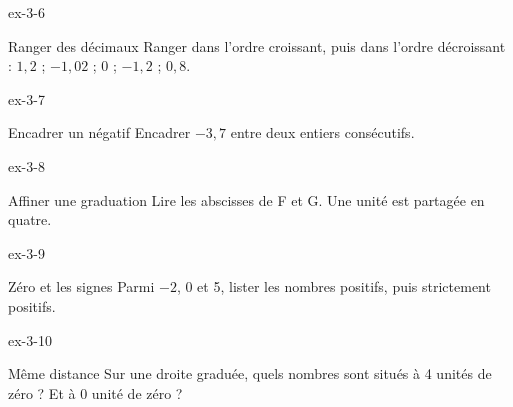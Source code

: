 \begin{blocLivre}{ex-3-6}\begin{exercice}[2]{Ranger des décimaux}
Ranger dans l’ordre croissant, puis dans l’ordre décroissant : $1{,}2$ ; $-1{,}02$ ; 0 ; $-1{,}2$ ; $0{,}8$.
\end{exercice}\end{blocLivre}
\begin{blocLivre}{ex-3-7}\begin{exercice}[2]{Encadrer un négatif}
Encadrer $-3{,}7$ entre deux entiers consécutifs.
\end{exercice}\end{blocLivre}
\begin{blocLivre}{ex-3-8}\begin{exercice}[2]{Affiner une graduation}
Lire les abscisses de F et G. Une unité est partagée en quatre.
\label{fig-ex-3-8}
\end{exercice}\end{blocLivre}
\begin{blocLivre}{ex-3-9}\begin{exercice}[2]{Zéro et les signes}
Parmi $-2$, 0 et 5, lister les nombres positifs, puis strictement positifs.
\end{exercice}\end{blocLivre}
\begin{blocLivre}{ex-3-10}\begin{exercice}[2]{Même distance}
Sur une droite graduée, quels nombres sont situés à 4 unités de zéro ? Et à 0 unité de zéro ?
\end{exercice}\end{blocLivre}


